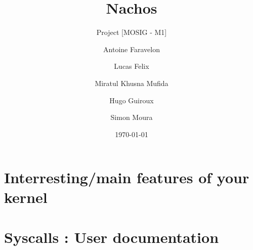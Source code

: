 \documentclass[a4paper,10pt]{article}
\title{Nachos}
\subtitle{Project [MOSIG - M1]}
\author{Antoine Faravelon \and Lucas Felix \and Miratul Khusna Mufida \and Hugo Guiroux \and Simon Moura}
\date{\today}
\begin{document}
\maketitle

\newpage
\tableofcontents
\newpage

\begin{abstract}
\end{abstract}

\section{Interresting/main features of your kernel}
\section{Syscalls : User documentation}
\end{document}
